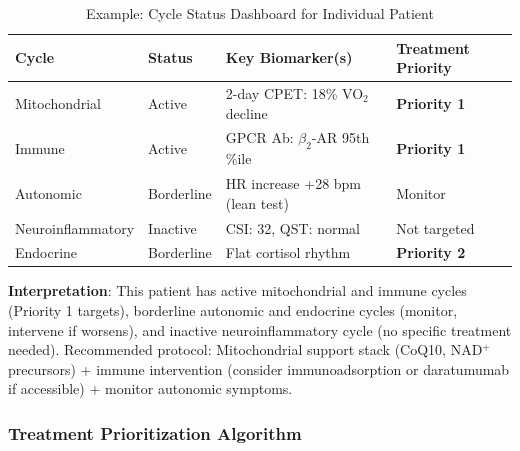 \begin{table}[htbp]
\centering
\caption{Example: Cycle Status Dashboard for Individual Patient}
\label{tab:cycle-dashboard-example}
\begin{tabular}{@{}llll@{}}
\toprule
\textbf{Cycle} & \textbf{Status} & \textbf{Key Biomarker(s)} & \textbf{Treatment Priority} \\
\midrule
Mitochondrial & \cellcolor{red!25}Active & 2-day CPET: 18\% VO$_2$ decline & \textbf{Priority 1} \\
Immune & \cellcolor{red!25}Active & GPCR Ab: $\beta_2$-AR 95th \%ile & \textbf{Priority 1} \\
Autonomic & \cellcolor{yellow!25}Borderline & HR increase +28 bpm (lean test) & Monitor \\
Neuroinflammatory & \cellcolor{green!25}Inactive & CSI: 32, QST: normal & Not targeted \\
Endocrine & \cellcolor{yellow!25}Borderline & Flat cortisol rhythm & \textbf{Priority 2} \\
\bottomrule
\end{tabular}
\par\smallskip
\footnotesize{\textbf{Interpretation}: This patient has active mitochondrial and immune cycles (Priority 1 targets), borderline autonomic and endocrine cycles (monitor, intervene if worsens), and inactive neuroinflammatory cycle (no specific treatment needed). Recommended protocol: Mitochondrial support stack (CoQ10, NAD$^+$ precursors) + immune intervention (consider immunoadsorption or daratumumab if accessible) + monitor autonomic symptoms.}
\end{table}

\subsubsection{Treatment Prioritization Algorithm}

